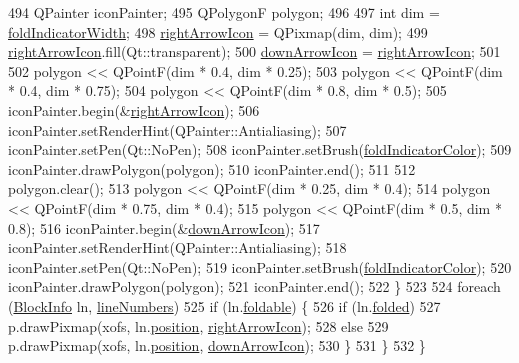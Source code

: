 \begin{DoxyCode}
494             QPainter iconPainter;
495             QPolygonF polygon;
496 
497             \textcolor{keywordtype}{int} dim = \hyperlink{class_sidebar_widget_a8be447556cc4ec612153b05eec332513}{foldIndicatorWidth};
498             \hyperlink{class_sidebar_widget_a7af9c03c7765c0ba88116fb397de74b5}{rightArrowIcon} = QPixmap(dim, dim);
499             \hyperlink{class_sidebar_widget_a7af9c03c7765c0ba88116fb397de74b5}{rightArrowIcon}.fill(Qt::transparent);
500             \hyperlink{class_sidebar_widget_af4a932d3ba2010fe06b78a7253d39d8b}{downArrowIcon} = \hyperlink{class_sidebar_widget_a7af9c03c7765c0ba88116fb397de74b5}{rightArrowIcon};
501 
502             polygon << QPointF(dim * 0.4, dim * 0.25);
503             polygon << QPointF(dim * 0.4, dim * 0.75);
504             polygon << QPointF(dim * 0.8, dim * 0.5);
505             iconPainter.begin(&\hyperlink{class_sidebar_widget_a7af9c03c7765c0ba88116fb397de74b5}{rightArrowIcon});
506             iconPainter.setRenderHint(QPainter::Antialiasing);
507             iconPainter.setPen(Qt::NoPen);
508             iconPainter.setBrush(\hyperlink{class_sidebar_widget_afa52fb75135fc07142c40b10b6255fa5}{foldIndicatorColor});
509             iconPainter.drawPolygon(polygon);
510             iconPainter.end();
511 
512             polygon.clear();
513             polygon << QPointF(dim * 0.25, dim * 0.4);
514             polygon << QPointF(dim * 0.75, dim * 0.4);
515             polygon << QPointF(dim * 0.5, dim * 0.8);
516             iconPainter.begin(&\hyperlink{class_sidebar_widget_af4a932d3ba2010fe06b78a7253d39d8b}{downArrowIcon});
517             iconPainter.setRenderHint(QPainter::Antialiasing);
518             iconPainter.setPen(Qt::NoPen);
519             iconPainter.setBrush(\hyperlink{class_sidebar_widget_afa52fb75135fc07142c40b10b6255fa5}{foldIndicatorColor});
520             iconPainter.drawPolygon(polygon);
521             iconPainter.end();
522         \}
523 
524         \textcolor{keywordflow}{foreach} (\hyperlink{struct_block_info}{BlockInfo} ln, \hyperlink{class_sidebar_widget_ac6820d4338c9763dd3b6a2da710a0fb0}{lineNumbers})
525             \textcolor{keywordflow}{if} (ln.\hyperlink{struct_block_info_a777eccf7133be7d93623791ffd0a3282}{foldable}) \{
526                 \textcolor{keywordflow}{if} (ln.\hyperlink{struct_block_info_a1aac7802107d29f5fc685a355a75ce1d}{folded})
527                     p.drawPixmap(xofs, ln.\hyperlink{struct_block_info_a6333e999c5d9f3e8882776e66eb087c0}{position}, \hyperlink{class_sidebar_widget_a7af9c03c7765c0ba88116fb397de74b5}{rightArrowIcon});
528                 \textcolor{keywordflow}{else}
529                     p.drawPixmap(xofs, ln.\hyperlink{struct_block_info_a6333e999c5d9f3e8882776e66eb087c0}{position}, \hyperlink{class_sidebar_widget_af4a932d3ba2010fe06b78a7253d39d8b}{downArrowIcon});
530             \}
531     \}
532 \}
\end{DoxyCode}


